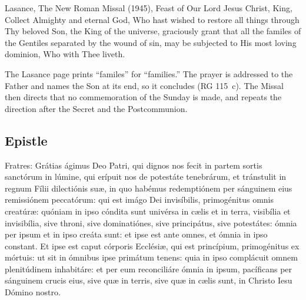 \begin{englishwitness}{Lasance, The New Roman Missal (1945), Feast of Our Lord Jesus Christ, King, Collect}
Almighty and eternal God, Who hast wished to restore all things through Thy
beloved Son, the King of the universe, graciously grant that all the familes of
the Gentiles separated by the wound of sin, may be subjected to His most loving
dominion, Who with Thee liveth.
\end{englishwitness}

\noindent The Lasance page prints ``familes'' for ``families.'' The prayer is
addressed to the Father and names the Son at its end, so it concludes
 (RG 115~c). The Missal then directs that no commemoration of
the Sunday is made, and repeats the direction after the Secret and the
Postcommunion.

\subsection{Epistle}
\label{proper-epistle}


\begin{latinproper}
Fratres: Grátias ágimus Deo Patri, qui dignos nos fecit in partem sortis
sanctórum in lúmine, qui erípuit nos de potestáte tenebrárum, et tránstulit
in regnum Fílii dilectiónis suæ, in quo habémus redemptiónem per sánguinem
eius remissiónem peccatórum: qui est imágo Dei invisíbilis, primogénitus
omnis creatúræ: quóniam in ipso cóndita sunt univérsa in cælis et in terra,
visibília et invisibília, sive throni, sive dominatiónes, sive principátus,
sive potestátes: ómnia per ipsum et in ipso creáta sunt: et ipse est ante
omnes, et ómnia in ipso constant. Et ipse est caput córporis Ecclésiæ, qui
est princípium, primogénitus ex mórtuis: ut sit in ómnibus ipse primátum
tenens: quia in ipso complácuit omnem plenitúdinem inhabitáre: et per eum
reconciliáre ómnia in ipsum, pacíficans per sánguinem crucis eius, sive quæ
in terris, sive quæ in cælis sunt, in Christo Iesu Dómino nostro.
\end{latinproper}

